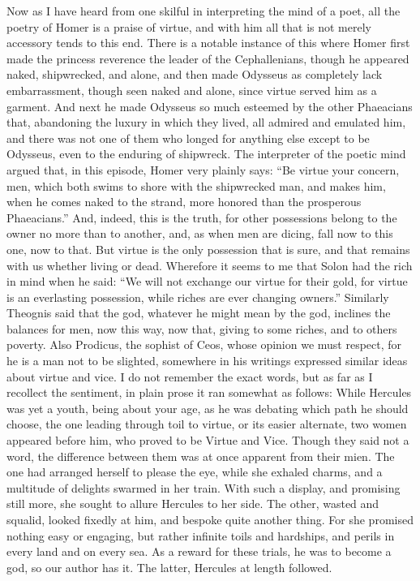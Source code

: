 \documentclass[a4paper]{article}
\begin{document}
Now as I have heard from one skilful in interpreting the mind of a poet, all the poetry of Homer is a praise of virtue, and with him all that is not merely accessory tends to this end. There is a notable instance of this where Homer first made the princess reverence the leader of the Cephallenians, though he appeared naked, shipwrecked, and alone, and then made Odysseus as completely lack embarrassment, though seen naked and alone, since virtue served him as a garment. And next he made Odysseus so much esteemed by the other Phaeacians that, abandoning the luxury in which they lived, all admired and emulated him, and there was not one of them who longed for anything else except to be Odysseus, even to the enduring of shipwreck. The interpreter of the poetic mind argued that, in this episode, Homer very plainly says: ``Be virtue your concern, men, which both swims to shore with the shipwrecked man, and makes him, when he comes naked to the strand, more honored than the prosperous Phaeacians.'' And, indeed, this is the truth, for other possessions belong to the owner no more than to another, and, as when men are dicing, fall now to this one, now to that. But virtue is the only possession that is sure, and that remains with us whether living or dead. Wherefore it seems to me that Solon had the rich in mind when he said: ``We will not exchange our virtue for their gold, for virtue is an everlasting possession, while riches are ever changing owners.'' Similarly Theognis said that the god, whatever he might mean by the god, inclines the balances for men, now this way, now that, giving to some riches, and to others poverty. Also Prodicus, the sophist of Ceos, whose opinion we must respect, for he is a man not to be slighted, somewhere in his writings expressed similar ideas about virtue and vice. I do not remember the exact words, but as far as I recollect the sentiment, in plain prose it ran somewhat as follows: While Hercules was yet a youth, being about your age, as he was debating which path he should choose, the one leading through toil to virtue, or its easier alternate, two women appeared before him, who proved to be Virtue and Vice. Though they said not a word, the difference between them was at once apparent from their mien. The one had arranged herself to please the eye, while she exhaled charms, and a multitude of delights swarmed in her train. With such a display, and promising still more, she sought to allure Hercules to her side. The other, wasted and squalid, looked fixedly at him, and bespoke quite another thing. For she promised nothing easy or engaging, but rather infinite toils and hardships, and perils in every land and on every sea. As a reward for these trials, he was to become a god, so our author has it. The latter, Hercules at length followed.
\end{document}
